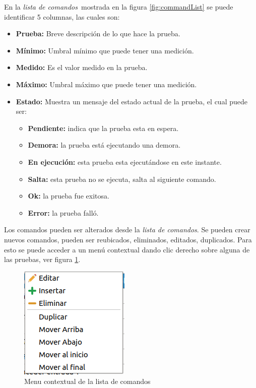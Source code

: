 \documentclass[a4paper,12pt]{refart}
\newcommand\commandList{\textit{lista de comandos}}
\begin{document}
En la \commandList\ mostrada en la figura \ref{fig:commandList} se puede identificar 5 columnas, las cuales son:

\begin{itemize}
\item \textbf{Prueba:} Breve descripción de lo que hace la prueba.
\item \textbf{Mínimo:} Umbral mínimo que puede tener una medición.
\item \textbf{Medido:} Es el valor medido en la prueba.
\item \textbf{Máximo:} Umbral máximo que puede tener una medición.
\item \textbf{Estado:} Muestra un mensaje del estado actual de la prueba, el cual puede ser:
	\begin{itemize}
	\item \textbf{Pendiente:} indica que la prueba esta en espera.
	\item \textbf{Demora:} la prueba está ejecutando una demora.
	\item \textbf{En ejecución:} esta prueba esta ejecutándose en este instante.
	\item \textbf{Salta:} esta prueba no se ejecuta, salta al siguiente comando.
	\item \textbf{Ok:} la prueba fue exitosa.
	\item \textbf{Error:} la prueba falló.
	\end{itemize}
\end{itemize}

Los comandos pueden ser alterados desde la \commandList{}. Se pueden crear nuevos comandos, pueden ser reubicados, eliminados, editados, duplicados. Para esto se puede acceder a un menú contextual dando clic derecho sobre alguna de las pruebas, ver figura \ref{fig:menuContextual}.

\begin{figure}[hbt!]\centering
\includegraphics[scale=1, frame]{images/menu_contextual} 
\caption{Menu contextual de la lista de comandos}
\label{fig:menuContextual}
\end{figure}
\end{document}
